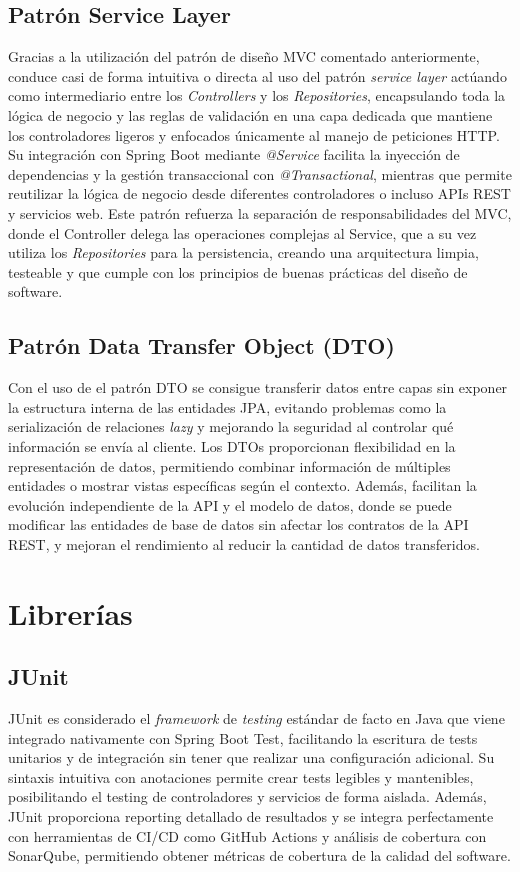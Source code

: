 \subsection{Patrón Service Layer}\label{patron-service-layer}
Gracias a la utilización del patrón de diseño MVC comentado anteriormente, conduce casi de forma intuitiva o directa al uso del patrón \emph{service layer} actúando como intermediario entre los \emph{Controllers} y los \emph{Repositories}, encapsulando toda la lógica de negocio y las reglas de validación en una capa dedicada que mantiene los controladores ligeros y enfocados únicamente al manejo de peticiones HTTP. Su integración con Spring Boot mediante \emph{@Service} facilita la inyección de dependencias y la gestión transaccional con \emph{@Transactional}, mientras que permite reutilizar la lógica de negocio desde diferentes controladores o incluso APIs REST y servicios web. Este patrón refuerza la separación de responsabilidades del MVC, donde el Controller delega las operaciones complejas al Service, que a su vez utiliza los \emph{Repositories} para la persistencia, creando una arquitectura limpia, testeable y que cumple con los principios de buenas prácticas del diseño de software.

\subsection{Patrón Data Transfer Object (DTO)}\label{patron-data-transfer-object}
Con el uso de el patrón DTO se consigue transferir datos entre capas sin exponer la estructura interna de las entidades JPA, evitando problemas como la serialización de relaciones \emph{lazy} y mejorando la seguridad al controlar qué información se envía al cliente. Los DTOs proporcionan flexibilidad en la representación de datos, permitiendo combinar información de múltiples entidades o mostrar vistas específicas según el contexto. Además, facilitan la evolución independiente de la API y el modelo de datos, donde se puede modificar las entidades de base de datos sin afectar los contratos de la API REST, y mejoran el rendimiento al reducir la cantidad de datos transferidos.

\section{Librerías}\label{librerias}

\subsection{JUnit}\label{junit}
JUnit es considerado el \emph{framework} de \emph{testing} estándar de facto en Java que viene integrado nativamente con Spring Boot Test, facilitando la escritura de tests unitarios y de integración sin tener que realizar una configuración adicional. Su sintaxis intuitiva con anotaciones permite crear tests legibles y mantenibles, posibilitando el testing de controladores y servicios de forma aislada. Además, JUnit proporciona reporting detallado de resultados y se integra perfectamente con herramientas de CI/CD como GitHub Actions y análisis de cobertura con SonarQube, permitiendo obtener métricas de cobertura de la calidad del software.


